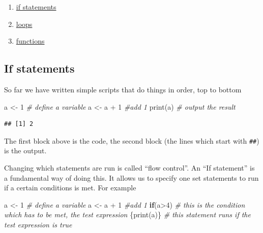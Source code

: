 \documentclass[
]{book}
\newenvironment{Shaded}{\begin{snugshade}}{\end{snugshade}}
\newcommand{\CommentTok}[1]{\textcolor[rgb]{0.56,0.35,0.01}{\textit{#1}}}
\newcommand{\ControlFlowTok}[1]{\textcolor[rgb]{0.13,0.29,0.53}{\textbf{#1}}}
\newcommand{\DecValTok}[1]{\textcolor[rgb]{0.00,0.00,0.81}{#1}}
\newcommand{\FunctionTok}[1]{\textcolor[rgb]{0.00,0.00,0.00}{#1}}
\newcommand{\NormalTok}[1]{#1}
\newcommand{\OtherTok}[1]{\textcolor[rgb]{0.56,0.35,0.01}{#1}}
\newcommand{\SpecialCharTok}[1]{\textcolor[rgb]{0.00,0.00,0.00}{#1}}
\providecommand{\tightlist}{%
  \setlength{\itemsep}{0pt}\setlength{\parskip}{0pt}}
\begin{document}
\begin{enumerate}
\def\labelenumi{\arabic{enumi}.}
\tightlist
\item
  \protect\hyperlink{if}{if statements}
\item
  \protect\hyperlink{loops}{loops}
\item
  \protect\hyperlink{functions}{functions}
\end{enumerate}

\hypertarget{if}{%
\subsection{If statements}\label{if}}

So far we have written simple scripts that do things in order, top to bottom

\begin{Shaded}
\begin{Highlighting}[]
\NormalTok{a }\OtherTok{\textless{}{-}} \DecValTok{1} \CommentTok{\# define a variable}
\NormalTok{a }\OtherTok{\textless{}{-}}\NormalTok{ a }\SpecialCharTok{+} \DecValTok{1} \CommentTok{\#add 1}
\FunctionTok{print}\NormalTok{(a) }\CommentTok{\# output the result}
\end{Highlighting}
\end{Shaded}

\begin{verbatim}
## [1] 2
\end{verbatim}

The first block above is the code, the second block (the lines which start with \texttt{\#\#}) is the output.

Changing which statements are run is called ``flow control''. An ``If statement'' is a fundamental way of doing this. It allows us to specify one set statements to run if a certain conditions is met. For example

\begin{Shaded}
\begin{Highlighting}[]
\NormalTok{a }\OtherTok{\textless{}{-}} \DecValTok{1} \CommentTok{\# define a variable}
\NormalTok{a }\OtherTok{\textless{}{-}}\NormalTok{ a }\SpecialCharTok{+} \DecValTok{1} \CommentTok{\#add 1}
\ControlFlowTok{if}\NormalTok{(a}\SpecialCharTok{\textgreater{}}\DecValTok{4}\NormalTok{) }\CommentTok{\# this is the condition which has to be met, the \textquotesingle{}test expression\textquotesingle{}}
\NormalTok{  \{}\FunctionTok{print}\NormalTok{(a)\} }\CommentTok{\# this statement runs if the test expression is true}
\end{Highlighting}
\end{Shaded}
\end{document}
